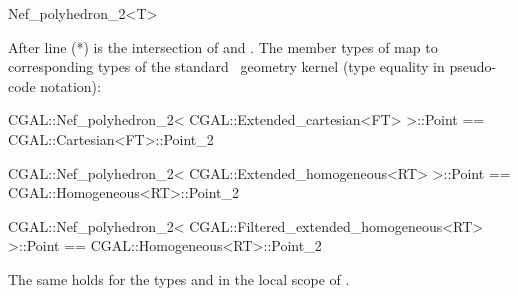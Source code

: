 \begin{ccRefClass}{Nef_polyhedron_2<T>}

After line (*)  is the intersection of  and . 
The member types of 
map to corresponding types of the standard \cgal\ geometry kernel
(type equality in pseudo-code notation):
\begin{ccExampleCode}
CGAL::Nef_polyhedron_2< CGAL::Extended_cartesian<FT> >::Point
  == CGAL::Cartesian<FT>::Point_2

CGAL::Nef_polyhedron_2< CGAL::Extended_homogeneous<RT> >::Point
   == CGAL::Homogeneous<RT>::Point_2

CGAL::Nef_polyhedron_2< CGAL::Filtered_extended_homogeneous<RT> >::Point
   == CGAL::Homogeneous<RT>::Point_2
\end{ccExampleCode}
The same holds for the types  and  in the
local scope of .

\end{ccRefClass}


